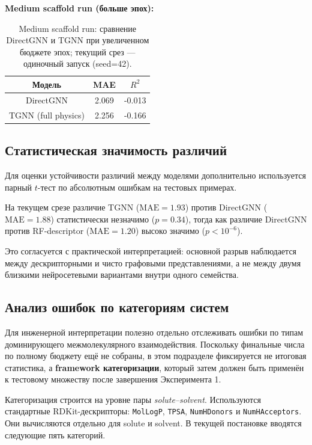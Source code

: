 \documentclass[11pt]{article}
\begin{document}
\textbf{Medium scaffold run (больше эпох):}

\begin{table}[H]
\centering
\begin{tabular}{|c|c|c|}
\hline
Модель & MAE & $R^2$ \\
\hline
DirectGNN & 2.069 & -0.013 \\
\hline
TGNN (full physics) & 2.256 & -0.166 \\
\hline
\end{tabular}
\caption{Medium scaffold run: сравнение DirectGNN и TGNN при увеличенном бюджете эпох; текущий срез --- одиночный запуск (seed=42).}
\end{table}

\subsection{Статистическая значимость различий}

Для оценки устойчивости различий между моделями дополнительно используется парный $t$-тест по абсолютным ошибкам на тестовых примерах.

На текущем срезе различие TGNN ($\mathrm{MAE}=1.93$) против DirectGNN ($\mathrm{MAE}=1.88$) статистически незначимо ($p=0.34$), тогда как различие DirectGNN против RF-descriptor ($\mathrm{MAE}=1.20$) высоко значимо ($p<10^{-6}$).

Это согласуется с практической интерпретацией: основной разрыв наблюдается между дескрипторными и чисто графовыми представлениями, а не между двумя близкими нейросетевыми вариантами внутри одного семейства.

\subsection{Анализ ошибок по категориям систем}
\label{subsec:error-analysis-categories}

Для инженерной интерпретации полезно отдельно отслеживать ошибки по типам доминирующего межмолекулярного взаимодействия. Поскольку финальные числа по полному бюджету ещё не собраны, в этом подразделе фиксируется не итоговая статистика, а \textbf{framework категоризации}, который затем должен быть применён к тестовому множеству после завершения Эксперимента 1.

Категоризация строится на уровне пары \textit{solute--solvent}. Используются стандартные RDKit-дескрипторы: \texttt{MolLogP}, \texttt{TPSA}, \texttt{NumHDonors} и \texttt{NumHAcceptors}. Они вычисляются отдельно для solute и solvent. В текущей постановке вводятся следующие пять категорий.
\end{document}

